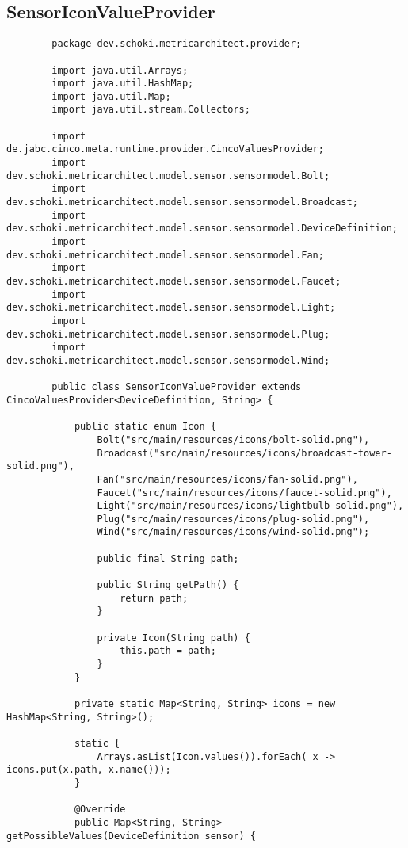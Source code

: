 \subsection{SensorIconValueProvider}
\begin{longlisting}
	\begin{verbatim}
		package dev.schoki.metricarchitect.provider;
		
		import java.util.Arrays;
		import java.util.HashMap;
		import java.util.Map;
		import java.util.stream.Collectors;
		
		import de.jabc.cinco.meta.runtime.provider.CincoValuesProvider;
		import dev.schoki.metricarchitect.model.sensor.sensormodel.Bolt;
		import dev.schoki.metricarchitect.model.sensor.sensormodel.Broadcast;
		import dev.schoki.metricarchitect.model.sensor.sensormodel.DeviceDefinition;
		import dev.schoki.metricarchitect.model.sensor.sensormodel.Fan;
		import dev.schoki.metricarchitect.model.sensor.sensormodel.Faucet;
		import dev.schoki.metricarchitect.model.sensor.sensormodel.Light;
		import dev.schoki.metricarchitect.model.sensor.sensormodel.Plug;
		import dev.schoki.metricarchitect.model.sensor.sensormodel.Wind;
		
		public class SensorIconValueProvider extends CincoValuesProvider<DeviceDefinition, String> {
			
			public static enum Icon {
				Bolt("src/main/resources/icons/bolt-solid.png"),
				Broadcast("src/main/resources/icons/broadcast-tower-solid.png"),
				Fan("src/main/resources/icons/fan-solid.png"),
				Faucet("src/main/resources/icons/faucet-solid.png"),
				Light("src/main/resources/icons/lightbulb-solid.png"),
				Plug("src/main/resources/icons/plug-solid.png"),
				Wind("src/main/resources/icons/wind-solid.png");
				
				public final String path;
				
				public String getPath() {
					return path;
				}
				
				private Icon(String path) {
					this.path = path;
				}
			}
			
			private static Map<String, String> icons = new HashMap<String, String>();
			
			static {
				Arrays.asList(Icon.values()).forEach( x -> icons.put(x.path, x.name()));
			}
			
			@Override
			public Map<String, String> getPossibleValues(DeviceDefinition sensor) {
				

\end{verbatim}
\end{longlisting}
